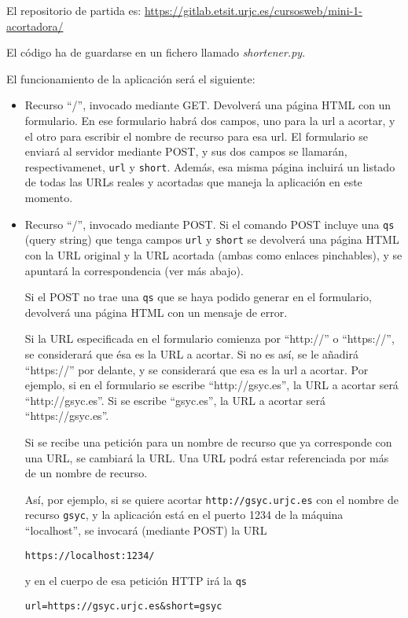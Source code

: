 El repositorio de partida es: \url{https://gitlab.etsit.urjc.es/cursosweb/mini-1-acortadora/}

El código ha de guardarse en un fichero llamado \emph{shortener.py}.

El funcionamiento de la aplicación será el siguiente:

\begin{itemize}
\item Recurso ``/'', invocado mediante GET. Devolverá una página HTML con un formulario. En ese formulario habrá dos campos, uno para la url a acortar, y el otro para escribir el nombre de recurso para esa url. El formulario se enviará al servidor mediante POST, y sus dos campos se llamarán, respectivamenet, \texttt{url} y \texttt{short}. Además, esa misma página incluirá un listado de todas las URLs reales y acortadas que maneja la aplicación en este momento.

\item Recurso ``/'', invocado mediante POST. Si el comando POST incluye una \texttt{qs} (query string) que tenga campos \texttt{url} y \texttt{short} se devolverá una página HTML con la URL original y la URL acortada (ambas como enlaces pinchables), y se apuntará la correspondencia (ver más abajo).

Si el POST no trae una \texttt{qs} que se haya podido generar en el formulario, devolverá una página HTML con un mensaje de error.

Si la URL especificada en el formulario comienza por ``http://'' o ``https://'', se considerará que ésa es la URL a acortar. Si no es así, se le añadirá ``https://'' por delante, y se considerará que esa es la url a acortar. Por ejemplo, si en el formulario se escribe ``http://gsyc.es'', la URL a acortar será ``http://gsyc.es''. Si se escribe ``gsyc.es'', la URL a acortar será ``https://gsyc.es''.

Si se recibe una petición para un nombre de recurso que ya corresponde con una URL, se cambiará la URL. Una URL podrá estar referenciada por más de un nombre de recurso.

Así, por ejemplo, si se quiere acortar \texttt{http://gsyc.urjc.es} con el nombre de recurso \texttt{gsyc}, y la aplicación está en el puerto 1234 de la máquina ``localhost'', se invocará (mediante POST) la URL

\texttt{https://localhost:1234/}

y en el cuerpo de esa petición HTTP irá la \texttt{qs}

\verb|url=https://gsyc.urjc.es&short=gsyc|


\end{itemize}
